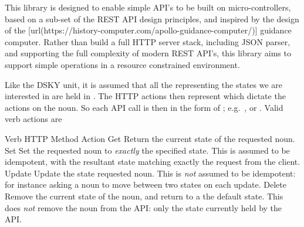 \startchapter[title={uREST}]

\startsection[title={Background}]

This library is designed to enable simple API's to be built on
micro-controllers, based on a sub-set of the REST API design principles,
and inspired by the design of the [url(https://history-computer.com/apollo-guidance-computer/)]
guidance computer. Rather than build a full HTTP server stack, including
JSON parser, and supporting the full complexity of modern REST API's,
this library aims to support simple operations in a resource constrained
environment.

Like the DSKY unit, it is assumed that all the 
representing the states we are interested in are held in
.
The HTTP actions then represent  which dictate the actions
on the noun. So each API call is then in the form of ;
e.g.~, or . Valid verb actions are

\startplacetable[location=none]
\startxtable
\startxtablehead[head]
\startxrowgroup[lastrow]
\startxrow
\startxcell[width={0.04\textwidth}] Verb \stopxcell
\startxcell[width={0.07\textwidth}] HTTP Method \stopxcell
\startxcell[width={0.89\textwidth}] Action \stopxcell
\stopxrow
\stopxrowgroup
\stopxtablehead
\startxtablebody[body]
\startxrow
\startxcell[width={0.04\textwidth}] Get \stopxcell
\startxcell[width={0.07\textwidth}]  \stopxcell
\startxcell[width={0.89\textwidth}] Return the current state of the
requested noun. \stopxcell
\stopxrow
\startxrow
\startxcell[width={0.04\textwidth}] Set \stopxcell
\startxcell[width={0.07\textwidth}]  \stopxcell
\startxcell[width={0.89\textwidth}] Set the requested noun to {\em
exactly} the specified state. This is assumed to be idempotent, with the
resultant state matching exactly the request from the client. \stopxcell
\stopxrow
\startxrow
\startxcell[width={0.04\textwidth}] Update \stopxcell
\startxcell[width={0.07\textwidth}]  \stopxcell
\startxcell[width={0.89\textwidth}] Update the state requested noun.
This is {\em not} assumed to be idempotent: for instance asking a noun
to move between two states on each update. \stopxcell
\stopxrow
\startxrowgroup[lastrow]
\startxrow
\startxcell[width={0.04\textwidth}] Delete \stopxcell
\startxcell[width={0.07\textwidth}]  \stopxcell
\startxcell[width={0.89\textwidth}] Remove the current state of the
noun, and return to a the default state. This does {\em not} remove the
noun from the API: only the state currently held by the API. \stopxcell
\stopxrow
\stopxrowgroup
\stopxtablebody
\startxtablefoot[foot]
\stopxtablefoot
\stopxtable
\stopplacetable

